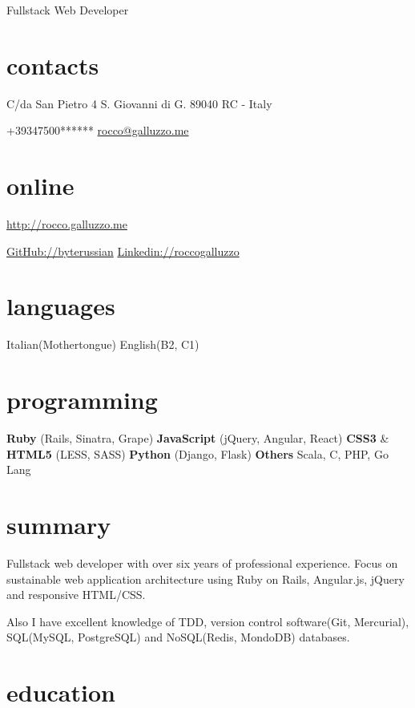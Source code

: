\documentclass[print]{cv}
\begin{document}
{Fullstack Web Developer}

\begin{aside}%
\section{contacts}
C/da San Pietro 4
S. Giovanni di G.
89040 RC - Italy\par\smallskip%
+39347500******
\href{mailto:rocco@galluzzo.me}{rocco@galluzzo.me}
\section{online}
\href{http://rocco.galluzzo.me}{http://rocco.galluzzo.me}
         \par\smallskip%
         \href{https://github.com/byterussian}{GitHub://byterussian}
         \href{http://www.linkedin.com/in/roccogalluzzo}{Linkedin://roccogalluzzo}
         \section{languages}
         Italian(Mothertongue)
 \smallskip%
         English(B2, C1)
         \section{programming}
          \textbf{Ruby}
         (Rails, Sinatra, Grape)
 \smallskip%
          \textbf{JavaScript}
         (jQuery, Angular, React)
 \smallskip%
          \textbf{CSS3} \&  \textbf{HTML5}
         (LESS, SASS)
 \smallskip%
          \textbf{Python}
         (Django, Flask)
 \smallskip%
          \textbf{Others}
         Scala, C, PHP, Go Lang
         \end{aside}

         \section{summary}
         Fullstack web developer with over six years of professional experience. Focus on sustainable web application architecture
         using Ruby on Rails, Angular.js, jQuery and responsive HTML/CSS.

         Also I have excellent knowledge of TDD, version control software(Git, Mercurial), SQL(MySQL, PostgreSQL) and NoSQL(Redis, MondoDB) databases.
         \section{education}
\end{document}
